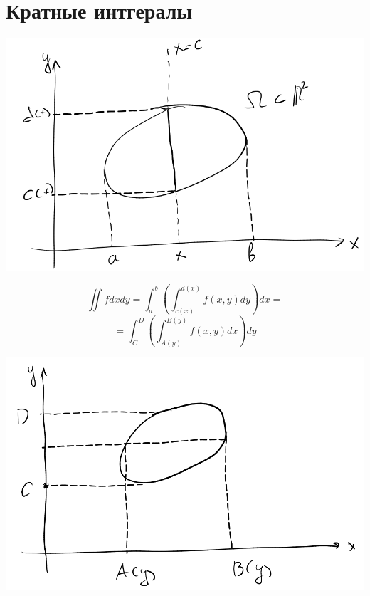 \documentclass[english]{article}
\theoremstyle{plain}
\theoremstyle{remark}
\theoremstyle{definition}
\begin{document}
\section{Кратные интгералы}
\label{sec:orgb243271}
\begin{center}
\includegraphics[scale=0.35]{2_1.png}
\end{center}
\[ \iint f dx dy = \int^b_a\left(\int^{d(x)}_{c(x)} f(x, y) dy\right)dx = \]
\[ = \int_C^D\left(\int_{A(y)}^{B(y)}f(x, y) dx\right)dy \]
\begin{center}
\includegraphics[scale=0.35]{2_2.png}
\end{center}
\end{document}
